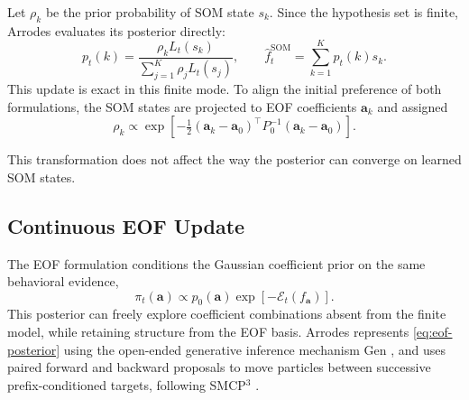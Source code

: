 \documentclass[letterpaper,10pt,conference]{ieeeconf}
\begin{document}
Let $\rho_k$ be the prior probability of SOM state $s_k$. Since the hypothesis set is finite, Arrodes evaluates its posterior directly:
\begin{equation}
  p_t(k)=\frac{\rho_k L_t(s_k)}{\sum_{j=1}^{K}\rho_jL_t(s_j)},\qquad
  \widehat f_t^{\mathrm{SOM}}=\sum_{k=1}^{K}p_t(k)s_k.
  \label{eq:som-posterior}
\end{equation}
This update is exact in this finite mode. To align the initial preference of both formulations, the SOM states are projected to EOF coefficients $\boldsymbol a_k$ and assigned
\begin{equation}
  \rho_k\propto\exp\!\left[-\tfrac12(\boldsymbol a_k-\boldsymbol a_0)^\top
  P_0^{-1}(\boldsymbol a_k-\boldsymbol a_0)\right].
  \label{eq:som-prior}
\end{equation}

This transformation does not affect the way the posterior can converge on learned SOM states.

\subsection{Continuous EOF Update}

The EOF formulation conditions the Gaussian coefficient prior on the same behavioral evidence,
\begin{equation}
  \pi_t(\boldsymbol a)\propto p_0(\boldsymbol a)
  \exp[-\mathcal E_t(f_{\boldsymbol a})].
  \label{eq:eof-posterior}
\end{equation}
This posterior can freely explore coefficient combinations absent from the finite model, while retaining structure from the EOF basis. Arrodes represents \eqref{eq:eof-posterior} using the open-ended generative inference mechanism Gen \cite{cusumano2019gen}, and uses paired forward and backward proposals to move particles between successive prefix-conditioned targets, following SMCP$^3$ \cite{lew2023smcp3}.
\end{document}
